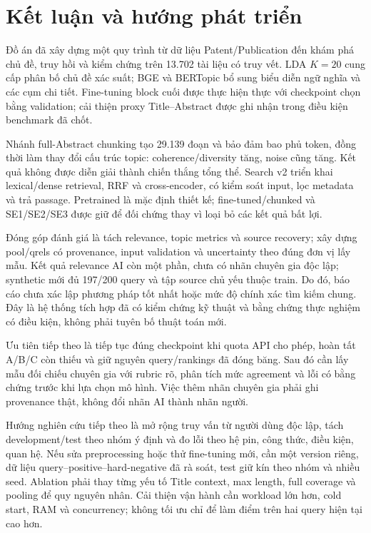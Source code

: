 \chapter*{Kết luận và hướng phát triển}
Đồ án đã xây dựng một quy trình từ dữ liệu Patent/Publication đến khám phá chủ đề, truy hồi và kiểm chứng trên 13.702 tài liệu có truy vết. LDA $K=20$ cung cấp phân bố chủ đề xác suất; BGE và BERTopic bổ sung biểu diễn ngữ nghĩa và các cụm chi tiết. Fine-tuning block cuối được thực hiện thực với checkpoint chọn bằng validation; cải thiện proxy Title--Abstract được ghi nhận trong điều kiện benchmark đã chốt.

Nhánh full-Abstract chunking tạo 29.139 đoạn và bảo đảm bao phủ token, đồng thời làm thay đổi cấu trúc topic: coherence/diversity tăng, noise cũng tăng. Kết quả không được diễn giải thành chiến thắng tổng thể. Search v2 triển khai lexical/dense retrieval, RRF và cross-encoder, có kiểm soát input, lọc metadata và trả passage. Pretrained là mặc định thiết kế; fine-tuned/chunked và SE1/SE2/SE3 được giữ để đối chứng thay vì loại bỏ các kết quả bất lợi.

Đóng góp đánh giá là tách relevance, topic metrics và source recovery; xây dựng pool/qrels có provenance, input validation và uncertainty theo đúng đơn vị lấy mẫu. Kết quả relevance AI còn một phần, chưa có nhãn chuyên gia độc lập; synthetic mới đủ 197/200 query và tập source chủ yếu thuộc train. Do đó, báo cáo chưa xác lập phương pháp tốt nhất hoặc mức độ chính xác tìm kiếm chung. Đây là hệ thống tích hợp đã có kiểm chứng kỹ thuật và bằng chứng thực nghiệm có điều kiện, không phải tuyên bố thuật toán mới.

Ưu tiên tiếp theo là tiếp tục đúng checkpoint khi quota API cho phép, hoàn tất A/B/C còn thiếu và giữ nguyên query/rankings đã đóng băng. Sau đó cần lấy mẫu đối chiếu chuyên gia với rubric rõ, phân tích mức agreement và lỗi có bằng chứng trước khi lựa chọn mô hình. Việc thêm nhãn chuyên gia phải ghi provenance thật, không đổi nhãn AI thành nhãn người.

Hướng nghiên cứu tiếp theo là mở rộng truy vấn từ người dùng độc lập, tách development/test theo nhóm ý định và đo lỗi theo hệ pin, công thức, điều kiện, quan hệ. Nếu sửa preprocessing hoặc thử fine-tuning mới, cần một version riêng, dữ liệu query--positive--hard-negative đã rà soát, test giữ kín theo nhóm và nhiều seed. Ablation phải thay từng yếu tố Title context, max length, full coverage và pooling để quy nguyên nhân. Cải thiện vận hành cần workload lớn hơn, cold start, RAM và concurrency; không tối ưu chỉ để làm điểm trên hai query hiện tại cao hơn.
